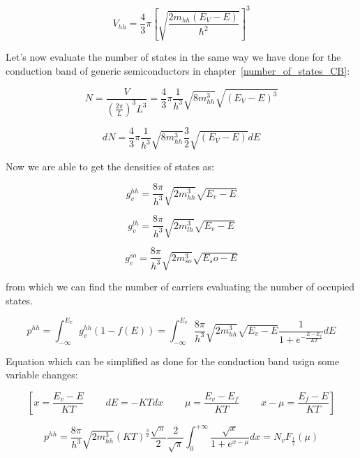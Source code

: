 	\begin{equation}
		V_{hh}=\frac{4}{3} \pi \left[\sqrt{\frac{2m_{hh}(E_V-E)}{\hbar^2}} \right]^3
	\end{equation}

	Let's now evaluate the number of states in the same way we have done for the conduction band of generic semiconductors in chapter~\ref{number_of_states_CB}:
	
	\begin{equation}
		N=\frac{V}{(\frac{2 \pi}{L})^3L^3}=\frac{4}{3} \pi\frac{1}{h^3} \sqrt{{8m_{hh}^3}} \sqrt{(E_V-E)^3}
	\end{equation}

	\begin{equation}
		dN=\frac{4}{3} \pi\frac{1}{h^3} \sqrt{{8m_{hh}^3}} \frac{3}{2} \sqrt{(E_V-E)}dE
	\end{equation}

	Now we are able to get the densities of states as:

	\begin{equation}
		g_v^{hh}=\frac{8 \pi}{h^3}\sqrt{2m_{hh}^3}\sqrt{E_v-E}
	\end{equation}
	
	\begin{equation}
		g_v^{lh}=\frac{8 \pi}{h^3}\sqrt{2m_{lh}^3}\sqrt{E_v-E}
	\end{equation}
	
	\begin{equation}
		g_v^{so}=\frac{8 \pi}{h^3}\sqrt{2m_{so}^3}\sqrt{E_so-E}
	\end{equation}

	from which we can find the number of carriers evaluating the number of occupied states.

	\begin{equation}
		p^{hh}=\int_{-\infty}^{E_v} g_v^{hh}(1-f(E))=\int_{-\infty}^{E_v}\frac{8 \pi}{h^3}\sqrt{2m_{hh}^3}\sqrt{E_v-E}\frac{1}{1+e^{-\frac{E-E_f}{KT}}}dE
	\end{equation}

	Equation which can be simplified as done for the conduction band usign some variable changes:
	
	\[\left[x= \frac{E_v-E}{KT} \ \ \ \ \ \ \ \ \ \ dE=-KTdx \ \ \ \ \ \ \ \ \ \ \mu=\frac{E_v-E_f}{KT} \ \ \ \ \ \ \ \ \ \ x- \mu = \frac{E_f-E}{KT}\right]\]

	\begin{equation}
		p^{hh}=\frac{8 \pi}{h^3}\sqrt{2m_{hh}^3}(KT)^{\frac{3}{2}}\frac{\sqrt{\pi}}{2} \frac{2} {\sqrt{\pi}} \int_0^{+\infty} \frac{\sqrt{x}}{1+e^{x- \mu}}dx=N_vF_{\frac{1}{2}}(\mu)
	\end{equation}
		
